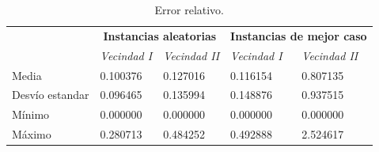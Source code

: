 \begin{table}[H]
    \begin{center}
        \begin{tabular}{ | l | l | l | l | l | }
            \hline
            \multicolumn{1}{|c|}{}&
            \multicolumn{2}{|c|}{\textbf{Instancias aleatorias}}&
            \multicolumn{2}{|c|}{\textbf{Instancias de mejor caso}}\\
            \cline{2-5}
                        &    \textit{Vecindad I}     &    \textit{Vecindad II}    &    \textit{Vecindad I}     &    \textit{Vecindad II}    \\ \hline
            Media       &   0.100376    &   0.127016    &   0.116154    &   0.807135    \\ \hline
            Desv\'io estandar       &   0.096465    &   0.135994    &   0.148876    &   0.937515    \\ \hline
            M\'inimo    &   0.000000    &   0.000000    &   0.000000    &   0.000000    \\ \hline
            M\'aximo    &   0.280713    &   0.484252    &   0.492888    &   2.524617    \\ \hline
        \end{tabular}
    \end{center}
    \caption{Error relativo.}    
    \label{table:error_relativo}
\end{table} 
